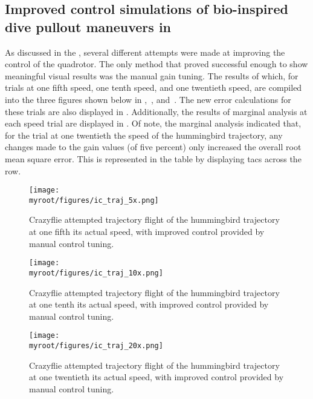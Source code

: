 \clearpage
\subsection{Improved control simulations of bio-inspired dive pullout maneuvers in \Matlab}
As discussed in the , several different attempts were made at improving the control of the quadrotor. The only method that proved successful enough to show meaningful visual results was the manual gain tuning. The results of which, for trials at one fifth speed, one tenth speed, and one twentieth speed, are compiled into the three figures shown below in ,~, and~. The new error calculations for these trials are also displayed in . Additionally, the results of marginal analysis at each speed trial are displayed in . Of note, the marginal analysis indicated that, for the trial at one twentieth the speed of the hummingbird trajectory, any changes made to the gain values (of five percent) only increased the overall root mean square error. This is represented in the table by displaying tacs across the row. 


\begin{figure}[p]
\begin{center}
\texttt{[image: \\myroot/figures/ic\_traj\_5x.png]}
\end{center}
\caption{Crazyflie attempted trajectory flight of the hummingbird trajectory at one fifth its actual speed, with improved control provided by manual control tuning.}
\label{fig:iconefifthspeed}
\end{figure}

\begin{figure}[p]
\begin{center}
\texttt{[image: \\myroot/figures/ic\_traj\_10x.png]}
\end{center}
\caption{Crazyflie attempted trajectory flight of the hummingbird trajectory at one tenth its actual speed, with improved control provided by manual control tuning.}
\label{fig:iconetenthspeed}
\end{figure}

\begin{figure}[p]
\begin{center}
\texttt{[image: \\myroot/figures/ic\_traj\_20x.png]}
\end{center}
\caption{Crazyflie attempted trajectory flight of the hummingbird trajectory at one twentieth its actual speed, with improved control provided by manual control tuning.}
\label{fig:iconetwentiethspeed}
\end{figure}

